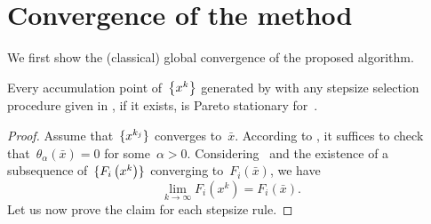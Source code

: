 \documentclass[../main]{subfiles}
\begin{document}
\section{Convergence of the method} 
We first show the (classical) global convergence of the proposed algorithm.
\begin{theorem} 
    Every accumulation point of~$\set*{x^k}$ generated by  with any stepsize selection procedure given in , if it exists, is Pareto stationary for~.
\end{theorem}
\begin{proof}
    Assume that~$\set{x^{k_j}}$ converges to~$\bar{x}$.
    According to , it suffices to check that~$\theta_\alpha(\bar{x}) = 0$ for some~$\alpha > 0$.
    Considering~ and the existence of a subsequence of~$\set{F_i\left(x^k\right)}$ converging to~$F_i(\bar{x})$, we have
    \begin{equation} \label{eq:pgm_stationary:convergence}
        \lim_{k \to \infty} F_i\left(x^k\right) = F_i(\bar{x})
        .\end{equation}
    Let us now prove the claim for each stepsize rule.


\end{proof}
\end{document}
